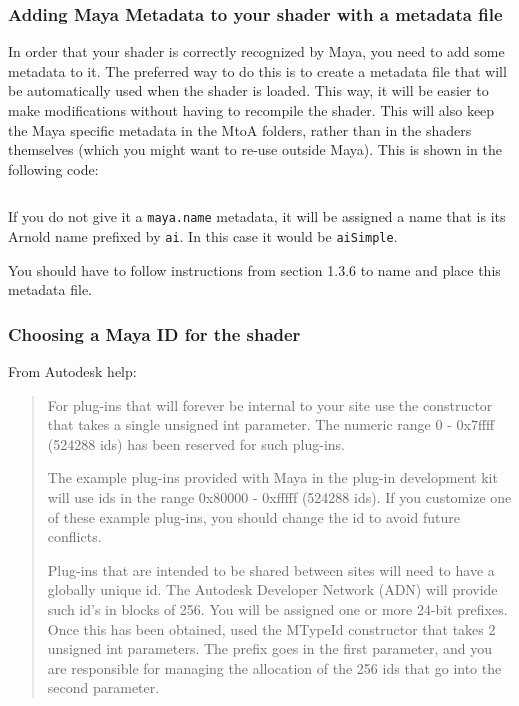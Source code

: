 \subsubsection{Adding Maya Metadata to your shader with a metadata file}
In order that your shader is correctly recognized by Maya, you need to add some metadata to it.
The preferred way to do this is to create a metadata file that will be automatically used when the shader is loaded.
This way, it will be easier to make modifications without having to recompile the shader.
This will also keep the Maya specific metadata in the MtoA folders, rather than in the shaders themselves (which you might want to re-use outside Maya).
This is shown in the following code:

\inputminted[mathescape,
linenos,
numbersep=5pt,
frame=lines,
framesep=2mm,
baselinestretch=1,
fontsize=\footnotesize,
tabsize=3,
label=simpleShader.mtd]
{mtd}{simpleShader.mtd}

If you do not give it a \texttt{maya.name} metadata, it will be assigned a name that is its Arnold name prefixed by \texttt{ai}. In this case it would be \texttt{aiSimple}.

You should have to follow instructions from section 1.3.6 to name and place this metadata file.


\subsubsection{Choosing a Maya ID for the shader}

From Autodesk help:

\begin{quotation}
For plug-ins that will forever be internal to your site use the
constructor that takes a single unsigned int parameter. The numeric
range 0 - 0x7ffff (524288 ids) has been reserved for such plug-ins.

The example plug-ins provided with Maya in the plug-in development kit
will use ids in the range 0x80000 - 0xfffff (524288 ids). If you
customize one of these example plug-ins, you should change the id to
avoid future conflicts.

Plug-ins that are intended to be shared between sites will need to
have a globally unique id. The Autodesk Developer Network (ADN) will
provide such id's in blocks of 256. You will be assigned one or more
24-bit prefixes. Once this has been obtained, used the MTypeId
constructor that takes 2 unsigned int parameters. The prefix goes in
the first parameter, and you are responsible for managing the
allocation of the 256 ids that go into the second parameter.
\end{quotation}

